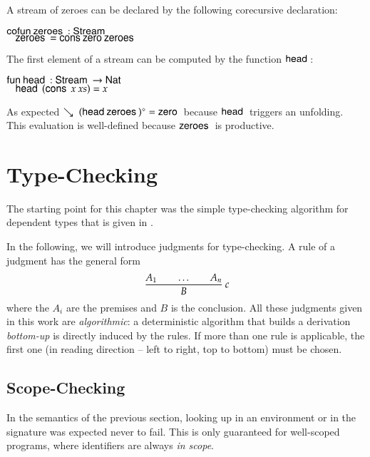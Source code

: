 A stream of zeroes can be declared by the following corecursive declaration:
\begin{bsp}
$\mathsf{cofun}\: \mathsf{zeroes}\:: \mathsf{Stream}\: $ \\
$\hspace*{3mm} \mathsf{zeroes}\: = \mathsf{cons}\: \mathsf{zero}\: \mathsf{zeroes}\:$
\end{bsp}

\noindent The first element of a stream can be computed by the function $\mathsf{head}\:$:
\begin{bsp}
$\mathsf{fun}\: \mathsf{head}\: : \mathsf{Stream}\: \rightarrow \mathsf{Nat}\:$\\
$\hspace*{3mm} \mathsf{head}\: \: (\mathsf{cons}\: \: x \: xs) = x$
\end{bsp}

As expected $\searrow\; {(\mathsf{head}\: \mathsf{zeroes}\:)^{\diamond}} = \mathsf{zero}\: $ because $\mathsf{head}\:$ triggers an unfolding. This evaluation is well-defined because $\mathsf{zeroes}\:$ is productive.

\chapter{Type-Checking}

\renewcommand\Check[5]{#1;#2;#3\vdash#4\leftleftarrows#5}
\newcommand\IsType[4]{#1;#2;#3\vdash#4\:\mathbf{Type}}
\newcommand\DataType[5]{#1;#2;#3;#4\vdash#5\:\mathbf{DataType}}
\newcommand\ConType[5]{#1;#2;#3;#4\vdash#5\:\mathbf{ConType}}
\newcommand\Infer[5]{#1;#2;#3\vdash#4\rightrightarrows#5}
\newcommand\EqVal[4]{#1;#2\vdash#3\Leftrightarrow#4}
\newcommand\FeqVal[4]{#1;#2\vdash#3{\:\leftrightarrow\:}#4}
\newcommand\DeqVal[2]{\vdash#1\leftrightarrow#2}
\newcommand\LeqVal[4]{#1;#2;\vdash#3\:\leqq\:#4}
\newcommand\FleqVal[4]{#1;#2\vdash#3{\:\ll\:}#4}
\newcommand\DLeqVal[2]{\vdash#1\leq#2}
\newcommand\SzLeq[2]{\vdash#1\sqsubseteq#2}

The starting point for this chapter was the simple type-checking algorithm for dependent types that is given in \cite{coquand96algorithm}.

In the following, we will introduce judgments for type-checking.
A rule of a judgment has the general form
\[
\ \dfrac{A_1 \qquad \ldots \qquad A_n}{B}
{\: c}
\]
\noindent where the $A_i$ are the premises and $B$ is the conclusion.
All these judgments given in this work are \emph{algorithmic}: a deterministic algorithm that builds a derivation \emph{bottom-up} is directly induced by the rules. If more than one rule is applicable, the first one (in reading direction -- left to right, top to bottom) must be chosen.

\section{Scope-Checking}
In the semantics of the previous section, looking up in an environment or in the signature was expected never to fail. This is only guaranteed for well-scoped programs, where identifiers are always \emph{in scope}.

